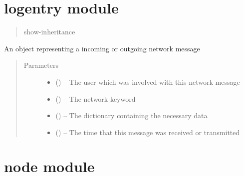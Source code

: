 \documentclass[letterpaper,10pt,english]{sphinxmanual}
\begin{document}
\chapter{logentry module}
\label{\detokenize{logentry:logentry-module}}\label{\detokenize{logentry::doc}}\label{\detokenize{logentry:module-logentry}}\begin{quote}\begin{description}
\item[{show-inheritance}] \leavevmode
\end{description}\end{quote}

\begin{fulllineitems}
\label{\detokenize{logentry:logentry.LogEntry}}
An object representing a incoming or outgoing network message
\begin{quote}\begin{description}
\item[{Parameters}] \leavevmode\begin{itemize}
\item {} 
 ({\hyperref[\detokenize{user:user.User}]{}}) -- The user which was involved with this network message

\item {} 
 () -- The network keyword

\item {} 
 () -- The dictionary containing the necessary data

\item {} 
 () -- The time that this message was received or transmitted

\end{itemize}

\end{description}\end{quote}

\end{fulllineitems}



\chapter{node module}
\label{\detokenize{node:module-node}}\label{\detokenize{node::doc}}\label{\detokenize{node:node-module}}
\end{document}
